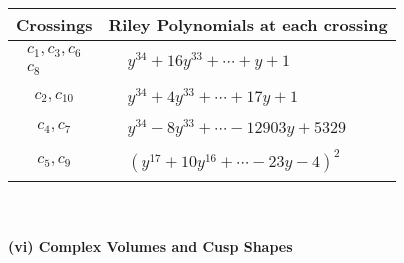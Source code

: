 \documentclass[1p]{elsarticle_modified}
\theoremstyle{definition}
\begin{document}
\begin{tabular}{m{50pt}|m{274pt}}
Crossings & \hspace{64pt}Riley Polynomials at each crossing \\
\hline $$\begin{aligned}c_{1},c_{3},c_{6}\\c_{8}\end{aligned}$$&$\begin{aligned}
&y^{34}+16 y^{33}+\cdots+y+1
\end{aligned}$\\
\hline $$\begin{aligned}c_{2},c_{10}\end{aligned}$$&$\begin{aligned}
&y^{34}+4 y^{33}+\cdots+17 y+1
\end{aligned}$\\
\hline $$\begin{aligned}c_{4},c_{7}\end{aligned}$$&$\begin{aligned}
&y^{34}-8 y^{33}+\cdots-12903 y+5329
\end{aligned}$\\
\hline $$\begin{aligned}c_{5},c_{9}\end{aligned}$$&$\begin{aligned}
&(y^{17}+10 y^{16}+\cdots-23 y-4)^{2}
\end{aligned}$\\
\hline
\end{tabular}\\~\\
\newpage\flushleft \textbf{(vi) Complex Volumes and Cusp Shapes}
\end{document}
